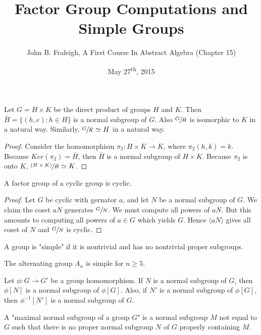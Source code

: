 \documentclass[a4paper,11pt]{article}
\title{Factor Group Computations and Simple Groups}
\author{John B. Fraleigh, A First Course In Abstract Algebra (Chapter 15)}
\date{May 27\textsuperscript{th}, 2015}
\begin{document}
\maketitle
{}

\begin{outline}

    Let \(G = H \times K\) be the direct product of groups \(H\) and \(K\). Then \(\bar{H} = \{(h, e) : h \in H\}\) 
    is a normal subgroup of \(G\). Also \(\sfrac{G}{\bar{H}}\) is isomorphic to \(K\) in a natural way. Similarly, 
    \(\sfrac{G}{\bar{K}} \simeq H\) in a natural way.
    
    \begin{proof}
      Consider the homomorphism \(\pi_{2}: H \times K \rightarrow K\), where \(\pi_{2}(h, k) = k\). Because
      \(Ker(\pi_{2}) = \bar{H}\), then \(\bar{H}\) is a normal subgroup of \(H \times K\). Because 
      \(\pi_{2}\) is onto \(K\), \(\sfrac{(H \times K)}{\bar{H}} \simeq K\).
    \end{proof}

    A factor group of a cyclic group is cyclic.
    
    \begin{proof}
      Let \(G\) be cyclic with gernator \(a\), and let \(N\) be a normal subgroup of \(G\). We claim the coset \(aN\)
      generates \(\sfrac{G}{N}\). We must compute all powers of \(aN\). But this amounts to computing all powers of 
      \(a \in G\) which yields \(G\). Hence \(\langle aN \rangle\) gives all coset of \(N\) and \(\sfrac{G}{N}\) is cyclic.
    \end{proof}
    
    A group is "simple" if it is nontrivial and has no nontrivial proper subgroups.
    
    The alternating group \(A_{n}\) is simple for \(n \geq 5\).
    
    Let \(\phi: G \rightarrow G'\) be a group homomorphism. If \(N\) is a normal subgroup of \(G\), then 
    \(\phi[N]\) is a normal subgroup of \(\phi[G]\). Also, if \(N'\) is a normal subgroup of \(\phi[G]\),
    then \(\phi^{-1}[N']\) is a normal subgroup of \(G\).
    
    A "maximal normal subgroup of a group \(G\)" is a normal subgroup \(M\) not equal to \(G\) such that 
    there is no proper normal subgroup \(N\) of \(G\) properly containing \(M\).
    

\end{outline}
\end{document}
